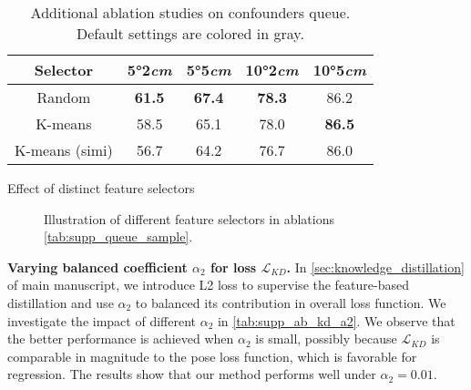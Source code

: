 \begin{table}[htbp]
    \begin{subtable}[t]{1.0\linewidth}  %
        \centering
        \setlength\tabcolsep{7pt}%
        \begin{tabular}{c|cccc}
            \toprule
            Selector & 5°2\emph{cm} & 5°5\emph{cm} & 10°2\emph{cm}  & 10°5\emph{cm}\\
            \midrule
            \rowcolor{mygray}
            Random  & \textbf{61.5}          &\textbf{67.4}    &\textbf{78.3} &86.2   \\
            K-means & 58.5          &65.1    &78.0 &\textbf{86.5}   \\
            K-means (simi) & 56.7          &64.2    &76.7 &86.0   \\
            \bottomrule
        \end{tabular}
        \caption{Effect of distinct feature selectors}
        \label{tab:supp_queue_sample}
    \end{subtable}

    \caption{Additional ablation studies on confounders queue. Default settings are colored in \colorbox{mygray}{gray}.}
    \label{table:supp_ablation_detail}
\end{table}

\begin{figure}[htbp]
    \centering
    \hspace{8pt}
    \caption{Illustration of different feature selectors in ablations \cref{tab:supp_queue_sample}.
    }
    \label{fig:subfig}
    \vspace{-0.2cm}
\end{figure}

\vspace{0.1cm}
\noindent
{\bf Varying balanced coefficient $\alpha_{2}$ for loss $\mathcal{L}_{KD}$.} In \cref{sec:knowledge_distillation} of main manuscript, we introduce L2 loss to supervise the feature-based distillation and use $\alpha_{2}$ to balanced its contribution in overall loss function. We investigate the impact of different $\alpha_{2}$ in \cref{tab:supp_ab_kd_a2}. We observe that the better performance is achieved when $\alpha_{2}$ is small, possibly because $\mathcal{L}_{KD}$ is comparable in magnitude to the pose loss function, which is favorable for regression. The results show that our method performs well under $\alpha_{2} = 0.01$.

